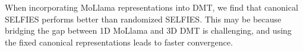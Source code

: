 When incorporating MoLlama representations into DMT, we find that canonical SELFIES performs better than randomized SELFIES. This may be because bridging the gap between 1D MoLlama and 3D DMT is challenging, and using the fixed canonical representations leads to faster convergence.



